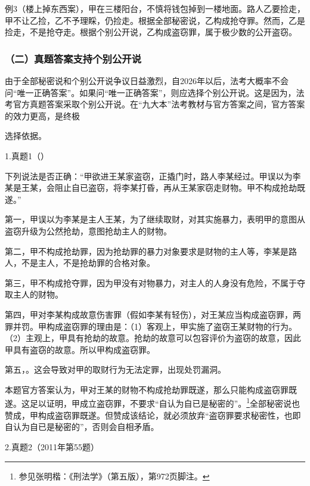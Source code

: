 例3（楼上掉东西案），甲在三楼阳台，不慎将钱包掉到一楼地面。路人乙要捡走，甲不让乙捡，乙不予理睬，仍捡走。根据全部秘密说，乙构成抢夺罪。然而，乙是捡走，不是抢夺走。根据个别公开说，乙构成盗窃罪，属于极少数的公开盗窃。

\subsubsection*{（二）真题答案支持个别公开说}

由于全部秘密说和个别公开说争议日益激烈，自2026年以后，法考大概率不会问“唯一正确答案”。如果问“唯一正确答案”，则应选择个别公开说。这是因为，法考官方真题答案采取个别公开说。在“九大本”法考教材与官方答案之间，官方答案的效力更高，是终极

选择依据。

1.真题1（）

下列说法是否正确：“甲欲进王某家盗窃，正撬门时，路人李某经过。甲误以为李某是王某，会阻止自已盗窃，将李某打昏，再从王某家窃走财物。甲不构成抢劫既遂。”

第一，甲误以为李某是主人王某，为了继续取财，对其实施暴力，表明甲的意图从盗窃升级为公然抢劫，意图抢劫主人的财物。

第二，甲不构成抢劫罪，因为抢劫罪的暴力对象要求是财物的主人等，李某是路人，不是主人，不是抢劫罪的合格对象。

第三，甲不构成抢夺罪，因为甲没有对物暴力，对主人的人身没有危险，不属于夺取主人的财物。

第四，甲对李某构成故意伤害罪（假如李某有轻伤），对王某应当构成盗窃罪，两罪并罚。甲构成盗窃罪的理由是：（1）客观上，甲实施了盗窃王某财物的行为。（2）主观上，甲具有抢劫的故意。抢劫的故意可以包容评价为盗窃的故意，因此甲具有盗窃的故意。所以甲构成盗窃罪。

第五，。这会导致对甲的取财行为无法定罪，出现处罚漏洞。

本题官方答案认为，甲对王某的财物不构成抢劫罪既遂，那么只能构成盗窃罪既遂。这足以证明，甲成立盗窃罪，不要求“自认为自已是秘密的”。\footnote{参见张明楷：《刑法学》（第五版），第972页脚注。}全部秘密说也赞成，甲构成盗窃罪既遂。但赞成该结论，就必须放弃“盗窃罪要求秘密性，也即自认为自已是秘密的”，否则会自相矛盾。

2.真题2（2011年第55题）

